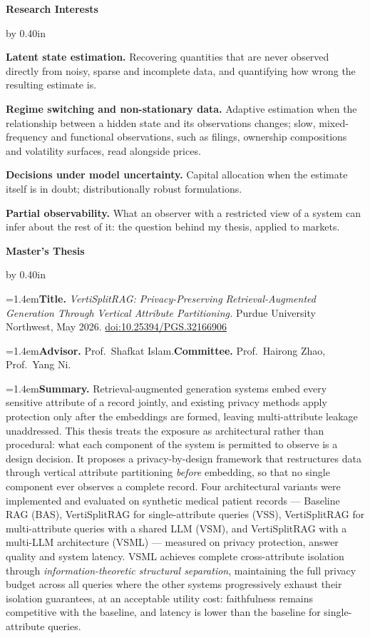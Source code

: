 \documentclass[10pt]{article}
\newcommand{\cvsection}[1]{%
  \vspace{8pt}%
  {\fontsize{11pt}{13pt}\selectfont\textbf{#1}}%
  \par\nobreak\vspace{4pt}%
}
\newenvironment{cvindent}{\par\advance\leftskip by 0.40in}{\par}
\newcommand{\cvline}[1]{\par\noindent #1\par\vspace{4pt}}
\newcommand{\cvlab}[2]{\par\noindent\hangindent=1.4em\hangafter=1\textbf{#1} #2\par\vspace{4pt}}
\begin{document}
\cvsection{Research Interests}
\begin{cvindent}
\cvline{\textbf{Latent state estimation.} Recovering quantities that are never observed directly from
noisy, sparse and incomplete data, and quantifying how wrong the resulting estimate is.}
\cvline{\textbf{Regime switching and non-stationary data.} Adaptive estimation when the relationship between a hidden
state and its observations changes; slow, mixed-frequency and functional observations, such as filings,
ownership compositions and volatility surfaces, read alongside prices.}
\cvline{\textbf{Decisions under model uncertainty.} Capital allocation when the estimate itself is in
doubt; distributionally robust formulations.}
\cvline{\textbf{Partial observability.} What an observer with a restricted view of a system can infer about
the rest of it: the question behind my thesis, applied to markets.}
\end{cvindent}

\cvsection{Master's Thesis}
\begin{cvindent}

\cvlab{Title.}{\emph{VertiSplitRAG: Privacy-Preserving Retrieval-Augmented Generation Through Vertical
Attribute Partitioning.} Purdue University Northwest, May 2026. \href{https://doi.org/10.25394/PGS.32166906}{doi:10.25394/PGS.32166906}}

\cvlab{Advisor.}{Prof.\ Shafkat Islam.\quad \textbf{Committee.} Prof.\ Hairong Zhao, Prof.\ Yang Ni.}

\cvlab{Summary.}{Retrieval-augmented generation systems embed every sensitive attribute of a record
jointly, and existing privacy methods apply protection only after the embeddings are formed, leaving
multi-attribute leakage unaddressed. This thesis treats the exposure as architectural rather than
procedural: what each component of the system is permitted to observe is a design decision. It proposes
a privacy-by-design framework that restructures data through vertical attribute partitioning
\emph{before} embedding, so that no single component ever observes a complete record. Four
architectural variants were implemented and evaluated on synthetic medical patient records --- Baseline
RAG (BAS), VertiSplitRAG for single-attribute queries (VSS), VertiSplitRAG for multi-attribute queries
with a shared LLM (VSM), and VertiSplitRAG with a multi-LLM architecture (VSML) --- measured on privacy
protection, answer quality and system latency. VSML achieves complete cross-attribute isolation through
\emph{information-theoretic structural separation}, maintaining the full privacy budget across all
queries where the other systems progressively exhaust their isolation guarantees, at an acceptable
utility cost: faithfulness remains competitive with the baseline, and latency is lower than the baseline
for single-attribute queries.}
\end{cvindent}
\end{document}
